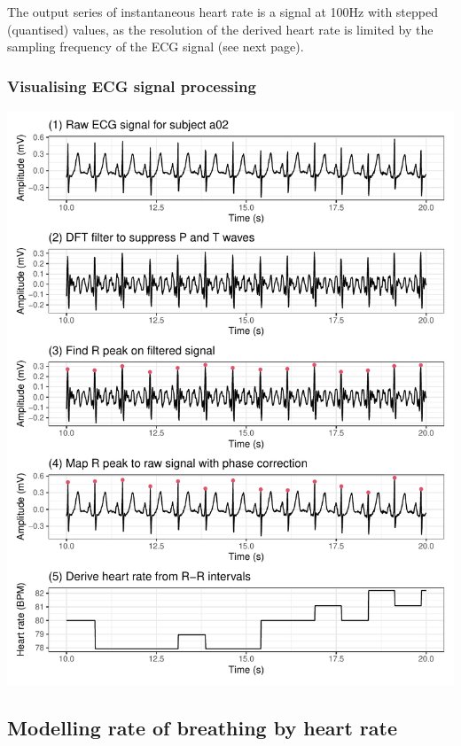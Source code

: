 \documentclass[
]{article}
\begin{document}
The output series of instantaneous heart rate is a signal at 100Hz with
stepped (quantised) values, as the resolution of the derived heart rate
is limited by the sampling frequency of the ECG signal (see next page).

\hypertarget{visual}{%
\subsubsection{Visualising ECG signal processing}\label{visual}}

\begin{center}\includegraphics{report_files/figure-latex/ecg-process-1} \end{center}

\hypertarget{modelling-rate-of-breathing-by-heart-rate}{%
\subsection{Modelling rate of breathing by heart
rate}\label{modelling-rate-of-breathing-by-heart-rate}}
\end{document}
